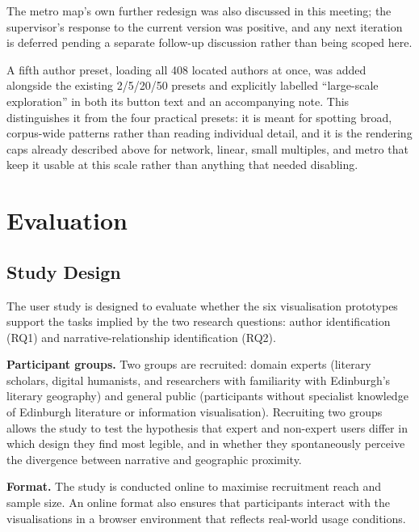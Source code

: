 \documentclass[logo,msc]{infthesis}
\begin{document}
The metro map's own further redesign was also discussed in this meeting; the supervisor's response to the current version was positive, and any next iteration is deferred pending a separate follow-up discussion rather than being scoped here.

A fifth author preset, loading all 408 located authors at once, was added alongside the existing 2/5/20/50 presets and explicitly labelled ``large-scale exploration'' in both its button text and an accompanying note. This distinguishes it from the four practical presets: it is meant for spotting broad, corpus-wide patterns rather than reading individual detail, and it is the rendering caps already described above for network, linear, small multiples, and metro that keep it usable at this scale rather than anything that needed disabling.
 
\chapter{Evaluation}
\label{chap:eval}
 
\section{Study Design}
\label{sec:study-design}

The user study is designed to evaluate whether the six visualisation prototypes support the tasks implied by the two research questions: author identification (RQ1) and narrative-relationship identification (RQ2).
 
\textbf{Participant groups.} Two groups are recruited: domain experts (literary scholars, digital humanists, and researchers with familiarity with Edinburgh's literary geography) and general public (participants without specialist knowledge of Edinburgh literature or information visualisation). Recruiting two groups allows the study to test the hypothesis that expert and non-expert users differ in which design they find most legible, and in whether they spontaneously perceive the divergence between narrative and geographic proximity.
 
\textbf{Format.} The study is conducted online to maximise recruitment reach and sample size. An online format also ensures that participants interact with the visualisations in a browser environment that reflects real-world usage conditions.
 
\end{document}
